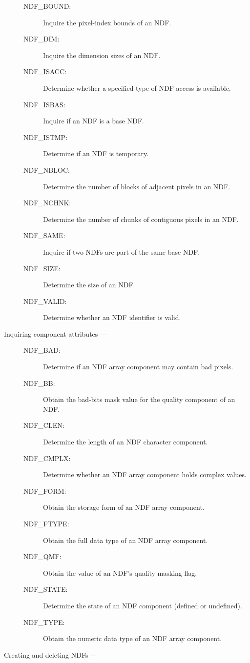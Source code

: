 \begin{description}
\begin{description}
\item [NDF\_BOUND:]  Inquire the pixel-index bounds of an NDF.
\item [NDF\_DIM:]  Inquire the dimension sizes of an NDF.
\item [NDF\_ISACC:]  Determine whether a specified type of NDF access is available.
\item [NDF\_ISBAS:]  Inquire if an NDF is a base NDF.
\item [NDF\_ISTMP:]  Determine if an NDF is temporary.
\item [NDF\_NBLOC:]  Determine the number of blocks of adjacent pixels in an NDF.
\item [NDF\_NCHNK:]  Determine the number of chunks of contiguous pixels in an NDF.
\item [NDF\_SAME:]  Inquire if two NDFs are part of the same base NDF.
\item [NDF\_SIZE:]  Determine the size of an NDF.
\item [NDF\_VALID:]  Determine whether an NDF identifier is valid.
\end{description}

\item [Inquiring component attributes ---]

\begin{description}
\item [NDF\_BAD:]  Determine if an NDF array component may contain bad pixels.
\item [NDF\_BB:]  Obtain the bad-bits mask value for the quality component of an NDF.
\item [NDF\_CLEN:]  Determine the length of an NDF character component.
\item [NDF\_CMPLX:]  Determine whether an NDF array component holds complex values.
\item [NDF\_FORM:]  Obtain the storage form of an NDF array component.
\item [NDF\_FTYPE:]  Obtain the full data type of an NDF array component.
\item [NDF\_QMF:]  Obtain the value of an NDF's quality masking flag.
\item [NDF\_STATE:]  Determine the state of an NDF component (defined or undefined).
\item [NDF\_TYPE:]  Obtain the numeric data type of an NDF array component.
\end{description}

\item [Creating and deleting NDFs ---]


\end{description}
